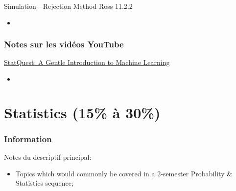 \documentclass[12pt, titlepage, french]{report}
\begin{document}
\begin{CHPT_SUMM_AUTO_NUMB}[label = {L.-24}]{Simulation---Rejection Method}
Ross 11.2.2
	\begin{itemize}
		\item	
	\end{itemize}
\end{CHPT_SUMM_AUTO_NUMB}

\subsection{Notes sur les vidéos YouTube}

\begin{YTB_SUMM}[label = {SQ-BASICS-ML-INTRO}]{\href{https://www.youtube.com/watch?v=Gv9_4yMHFhI&list=PLblh5JKOoLUICTaGLRoHQDuF_7q2GfuJF&index=2&t=0s}{StatQuest: A Gentle Introduction to Machine Learning}}
\begin{itemize}
	\item	
\end{itemize}
\end{YTB_SUMM}

\newpage

\chapter[Statistics]{Statistics (15\% à 30\%)}

\subsection{Information}

\begin{distributions}[Description]
Notes du descriptif principal:
\begin{itemize}
	\item	Topics which would commonly be covered in a 2-semester Probability \& Statistics sequence;
\end{itemize}
\end{distributions}
\end{document}
